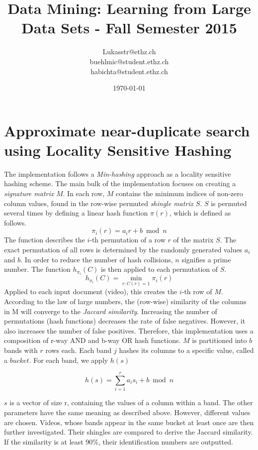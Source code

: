 \documentclass[a4paper, 11pt]{article}
\title{Data Mining: Learning from Large Data Sets - Fall Semester 2015}
\author{Lukasstr@ethz.ch\\ buehlmic@student.ethz.ch\\ habichta@student.ethz.ch\\}
\date{\today}
\begin{document}
\maketitle

\section*{Approximate near-duplicate search using Locality Sensitive Hashing} 


The implementation follows a \textit{Min-hashing} approach as a locality sensitive hashing scheme. The main bulk of the implementation focuses on creating a \textit{signature matrix} $M$.  In each row, $M$ contains the minimum indices of non-zero column values, found in the row-wise permuted \textit{shingle matrix} $S$. $S$ is permuted several times by defining a linear hash function $\pi(r)$, which is defined as follows.
$$ \pi_{i}(r) =  a_{i}r + b \bmod n$$
The function describes the $i$-th permutation of a row $r$ of the matrix $S$. The exact permutation of all rows is determined by the randomly generated values $a_{i}$ and $b$. In order to reduce the number of hash collisions, $n$ signifies a  prime number. The function $h_{\pi_{i}}(C)$ is then applied to each permutation of $S$.
$$h_{\pi_{i}}(C)  = \min_{r:C(r)=1} \pi_{i}(r)$$
Applied to each input document (video), this creates the $i$-th row of $M$. According to the law of large numbers, the (row-wise) similarity of the columns in M will converge to the \textit{Jaccard similarity}. Increasing the number of permutations (hash functions) decreases the rate of false negatives. However, it also increases the number of false positives. Therefore, this implementation uses a composition of r-way AND and b-way OR hash functions. $M$ is partitioned into $b$ bands with $r$ rows each. Each band $j$ hashes its columns to a specific value, called a $bucket$. For each band, we apply $h(s)$

$$h(s) = \displaystyle\sum_{i=1}^{r} a_{i}s_{i} + b \bmod n $$

$s$ is a vector of size r, containing the values of a column within a band. The other parameters have the same meaning as described above. However, different values are chosen. Videos, whose bands appear in the same bucket at least once are then further investigated. Their shingles are compared to derive the Jaccard similarity. If the similarity is at least 90\%, their identification numbers are outputted.
\end{document}
